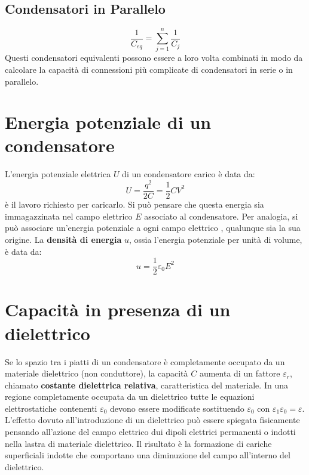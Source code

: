         \subsection{Condensatori in Parallelo}
            \begin{equation}
                \frac{1}{C_{eq}} = \sum_{j = 1}^{n} \frac{1}{C_j}
            \end{equation}
    Questi condensatori equivalenti possono essere a loro volta combinati in 
    modo da calcolare la capacità di connessioni più complicate di condensatori
    in serie o in parallelo.

    \section{Energia potenziale di un condensatore} L'energia potenziale 
    elettrica $U$ di un condensatore carico è data da:
        \begin{equation}
            U = \frac{q^2}{2C} = \frac{1}{2}CV^2
        \end{equation}
    è il lavoro richiesto per caricarlo. Si può pensare che questa energia sia 
    immagazzinata nel campo elettrico $E$ associato al condensatore. 
    Per analogia, si può associare un'energia potenziale a ogni campo elettrico
    , qualunque sia la sua origine. La \textbf{densità di energia} $u$, ossia
    l'energia potenziale per unità di volume, è data da:
        \begin{equation}
            u = \frac{1}{2}\varepsilon_0E^2
        \end{equation}
    
    \section{Capacità in presenza di un dielettrico} Se lo spazio tra i piatti
    di un condensatore è completamente occupato da un materiale dielettrico
    (non conduttore), la capacità $C$ aumenta di un fattore $\varepsilon_r$,
    chiamato \textbf{costante dielettrica relativa}, caratteristica del 
    materiale. In una regione completamente occupata da un dielettrico tutte le
    equazioni elettrostatiche contenenti $\varepsilon_0$ devono essere 
    modificate sostituendo $\varepsilon_0$ con $\varepsilon_1\varepsilon_0 =
    \varepsilon$.\\
    L'effetto dovuto all'introduzione di un dielettrico può essere spiegata
    fisicamente pensando all'azione del campo elettrico dui dipoli elettrici 
    permanenti o indotti nella lastra di materiale dielettrico. Il risultato è
    la formazione di cariche superficiali indotte che comportano una 
    diminuzione del campo all'interno del dielettrico.
        
